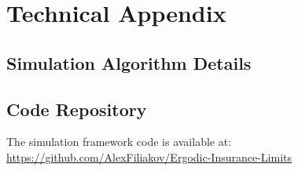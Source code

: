 \documentclass[11pt,letterpaper]{article}
\begin{document}



\appendix
\section{Technical Appendix}

\subsection{Simulation Algorithm Details}


\subsection{Code Repository}

The simulation framework code is available at:\\
\url{https://github.com/AlexFiliakov/Ergodic-Insurance-Limits}
\end{document}
